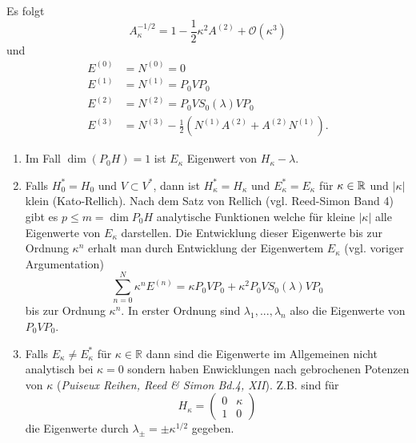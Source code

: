 \documentclass{mycourse}
\begin{document}
Es folgt $$A_\kappa^{-1/2}= 1- \frac{1}{2} \kappa^2 A^{(2)} + \mathcal O(\kappa^3)$$ und
\begin{align*}
E^{(0)}&=N^{(0)} =0\\
E^{(1)} &= N^{(1)} = P_0 V P_0\\
E^{(2)} &= N^{(2)} = P_0 V S_0(\lambda) V P_0\\
E^{(3)} &= N^{(3)} - \frac{1}{2} (N^{(1)} A^{(2)} + A^{(2)} N^{(1)}).
\end{align*}
\begin{nt*}
\begin{enumerate}[1)]
\item Im Fall $\dim(P_0H)=1$ ist $E_\kappa$ Eigenwert von $H_\kappa - \lambda$.
\item Falls $H_0^* =H_0$ und $V\subset V^*$, dann ist $H_\kappa^* = H_\kappa$ und $E^*_\kappa = E_\kappa$ für $\kappa\in \mathbb{R}$ und $|\kappa|$ klein (Kato-Rellich). Nach dem Satz von Rellich (vgl. Reed-Simon Band 4) gibt es $p\le m = \dim P_0 H$ analytische Funktionen welche für kleine $|\kappa|$ alle Eigenwerte von $E_\kappa$ darstellen. Die Entwicklung dieser Eigenwerte bis zur Ordnung $\kappa^n$ erhalt man durch Entwicklung der Eigenwertem $E_\kappa$ (vgl. voriger Argumentation)
\[
\sum_{n=0}^N \kappa^n E^{(n)} = \kappa P_0 V P_0 + \kappa^2 P_0 V S_0(\lambda) V P_0
\]
bis zur Ordnung $\kappa^n$. In erster Ordnung sind $\lambda_1,..., \lambda_n$ also die Eigenwerte von $P_0 V P_0$.
\item Falls $E_{\kappa}\neq E_{\kappa}^*$ für $\kappa\in \mathbb R$ dann sind die Eigenwerte im Allgemeinen nicht analytisch bei $\kappa=0$ sondern haben Enwicklungen nach gebrochenen Potenzen von $\kappa$ (\emph{Puiseux Reihen, Reed \& Simon Bd.4, XII}).  Z.B. sind für
\[
H_{\kappa} =\begin{pmatrix} 0 & \kappa \\ 1 & 0 \end{pmatrix}
\]
die Eigenwerte durch $\lambda_{\pm} = \pm \kappa^{1/2}$ gegeben.
\end{enumerate}
\end{nt*}
\end{document}
